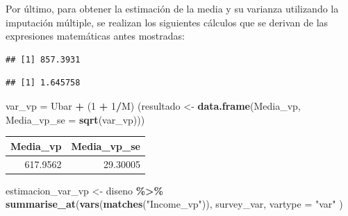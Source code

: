 \documentclass[
  spanish,
  12pt,
]{book}
\newenvironment{Shaded}{\begin{snugshade}}{\end{snugshade}}
\newcommand{\AttributeTok}[1]{\textcolor[rgb]{0.13,0.29,0.53}{#1}}
\newcommand{\DecValTok}[1]{\textcolor[rgb]{0.00,0.00,0.81}{#1}}
\newcommand{\FunctionTok}[1]{\textcolor[rgb]{0.13,0.29,0.53}{\textbf{#1}}}
\newcommand{\NormalTok}[1]{#1}
\newcommand{\OtherTok}[1]{\textcolor[rgb]{0.56,0.35,0.01}{#1}}
\newcommand{\SpecialCharTok}[1]{\textcolor[rgb]{0.81,0.36,0.00}{\textbf{#1}}}
\newcommand{\StringTok}[1]{\textcolor[rgb]{0.31,0.60,0.02}{#1}}
\begin{document}
Por último, para obtener la estimación de la media y su varianza utilizando la imputación múltiple, se realizan los siguientes cálculos que se derivan de las expresiones matemáticas antes mostradas:

\begin{Shaded}
\end{Shaded}

\begin{verbatim}
## [1] 857.3931
\end{verbatim}

\begin{Shaded}
\end{Shaded}

\begin{verbatim}
## [1] 1.645758
\end{verbatim}

\begin{Shaded}
\begin{Highlighting}[]
\NormalTok{var\_vp }\OtherTok{=}\NormalTok{ Ubar }\SpecialCharTok{+}\NormalTok{ (}\DecValTok{1} \SpecialCharTok{+} \DecValTok{1}\SpecialCharTok{/}\NormalTok{M) }
\NormalTok{(resultado }\OtherTok{\textless{}{-}} \FunctionTok{data.frame}\NormalTok{(Media\_vp, }
                        \AttributeTok{Media\_vp\_se =} \FunctionTok{sqrt}\NormalTok{(var\_vp)))}
\end{Highlighting}
\end{Shaded}

\begin{tabular}{r|r}
\hline
Media\_vp & Media\_vp\_se\\
\hline
617.9562 & 29.30005\\
\hline
\end{tabular}

\begin{Shaded}
\begin{Highlighting}[]
\NormalTok{estimacion\_var\_vp }\OtherTok{\textless{}{-}}\NormalTok{  diseno }\SpecialCharTok{\%\textgreater{}\%} 
  \FunctionTok{summarise\_at}\NormalTok{(}\FunctionTok{vars}\NormalTok{(}\FunctionTok{matches}\NormalTok{(}\StringTok{"Income\_vp"}\NormalTok{)), }
\NormalTok{               survey\_var,  }\AttributeTok{vartype =} \StringTok{"var"}\NormalTok{ )}
\end{Highlighting}
\end{Shaded}
\end{document}
